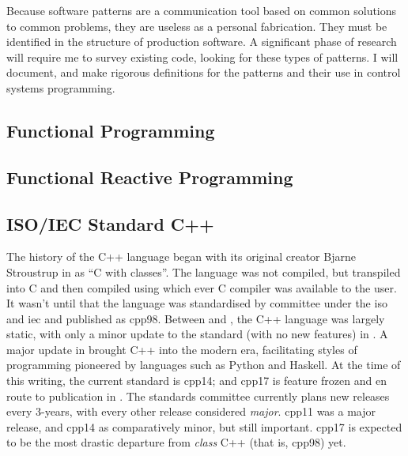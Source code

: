 Because software patterns are a communication tool based on common solutions to
common problems, they are useless as a personal fabrication. They must be
identified in the structure of production software. A significant phase of
research will require me to survey existing code, looking for these types of
patterns. I will document, and make rigorous definitions for the patterns and
their use in control systems programming.



\subsection{Functional Programming}


















\subsection{Functional Reactive Programming}




















\subsection{ISO/IEC Standard C++}


The history of the C++ language began with its original creator Bjarne
Stroustrup in  as ``C with classes''. The language was not compiled,
but transpiled into C and then compiled using which ever C compiler was
available to the user. It wasn't until  that the language was
standardised by committee under the \ac{iso} and \ac{iec} and published as
\acl{cpp98}. Between  and , the C++ language was largely
static, with only a minor update to the standard (with no new features) in
. A major update in  brought C++ into the modern era,
facilitating styles of programming pioneered by languages such as Python and
Haskell. At the time of this writing, the current standard is \ac{cpp14}; and
\ac{cpp17} is feature frozen and en route to publication in . The
standards committee currently plans new releases every 3-years, with every other
release considered \emph{major}. \ac{cpp11} was a major release, and \ac{cpp14}
as comparatively minor, but still important. \ac{cpp17} is expected to be the
most drastic departure from \emph{class} C++ (that is, \ac{cpp98}) yet.

